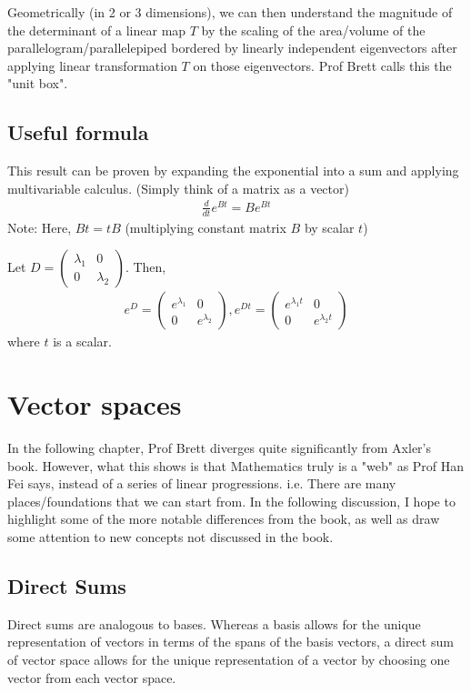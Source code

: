 \documentclass{article}
\begin{document}
Geometrically (in 2 or 3 dimensions), we can then understand the magnitude of the determinant of a linear map $T$ by the scaling of the area/volume of the parallelogram/parallelepiped bordered by linearly independent eigenvectors after applying linear transformation $T$ on those eigenvectors. Prof Brett calls this the "unit box".

\subsection{Useful formula}
This result can be proven by expanding the exponential into a sum and applying multivariable calculus. (Simply think of a matrix as a vector)
\begin{align*}
	\frac{d}{dt} e^{Bt}=Be^{Bt}
\end{align*}
Note: Here, $Bt=tB$ (multiplying constant matrix $B$ by scalar $t$)

Let $D=\begin{pmatrix}
	\lambda_1 & 0\\
	0 & \lambda_2
\end{pmatrix}$.
Then,
\begin{align*}
	e^{D}=\begin{pmatrix}
		e^{\lambda_1} & 0\\
		0 & e^{\lambda_2}
	\end{pmatrix}, 
	e^{Dt}=\begin{pmatrix}
		e^{\lambda_1t} & 0\\
		0 & e^{\lambda_2t}
	\end{pmatrix}
\end{align*}
where $t$ is a scalar.


\section{Vector spaces}
In the following chapter, Prof Brett diverges quite significantly from Axler's book. However, what this shows is that Mathematics truly is a "web" as Prof Han Fei says, instead of a series of linear progressions. i.e. There are many places/foundations that we can start from. In the following discussion, I hope to highlight some of the more notable differences from the book, as well as draw some attention to new concepts not discussed in the book.

\subsection{Direct Sums}
Direct sums are analogous to bases. Whereas a basis allows for the unique representation of vectors in terms of the spans of the basis vectors, a direct sum of vector space allows for the unique representation of a vector by choosing one vector from each vector space.
\end{document}
